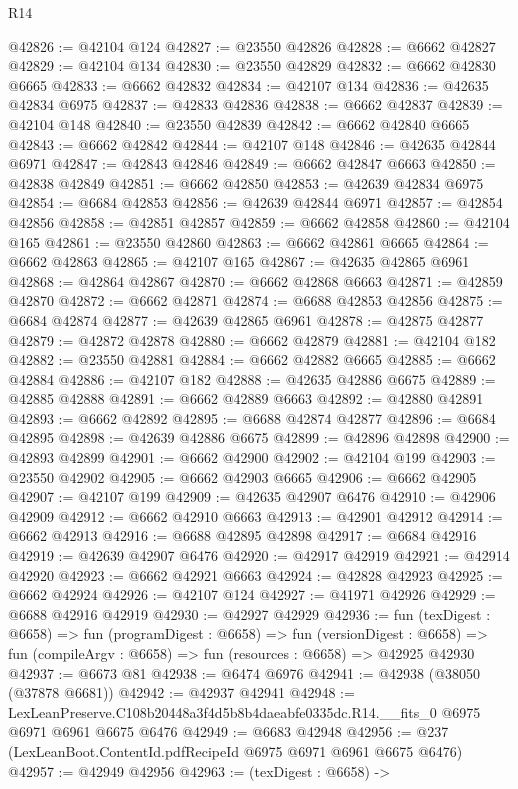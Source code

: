 \begin{lexlean}{R14}
\begin{coremodule}
@42826 := @42104 @124
@42827 := @23550 @42826
@42828 := @6662 @42827
@42829 := @42104 @134
@42830 := @23550 @42829
@42832 := @6662 @42830 @6665
@42833 := @6662 @42832
@42834 := @42107 @134
@42836 := @42635 @42834 @6975
@42837 := @42833 @42836
@42838 := @6662 @42837
@42839 := @42104 @148
@42840 := @23550 @42839
@42842 := @6662 @42840 @6665
@42843 := @6662 @42842
@42844 := @42107 @148
@42846 := @42635 @42844 @6971
@42847 := @42843 @42846
@42849 := @6662 @42847 @6663
@42850 := @42838 @42849
@42851 := @6662 @42850
@42853 := @42639 @42834 @6975
@42854 := @6684 @42853
@42856 := @42639 @42844 @6971
@42857 := @42854 @42856
@42858 := @42851 @42857
@42859 := @6662 @42858
@42860 := @42104 @165
@42861 := @23550 @42860
@42863 := @6662 @42861 @6665
@42864 := @6662 @42863
@42865 := @42107 @165
@42867 := @42635 @42865 @6961
@42868 := @42864 @42867
@42870 := @6662 @42868 @6663
@42871 := @42859 @42870
@42872 := @6662 @42871
@42874 := @6688 @42853 @42856
@42875 := @6684 @42874
@42877 := @42639 @42865 @6961
@42878 := @42875 @42877
@42879 := @42872 @42878
@42880 := @6662 @42879
@42881 := @42104 @182
@42882 := @23550 @42881
@42884 := @6662 @42882 @6665
@42885 := @6662 @42884
@42886 := @42107 @182
@42888 := @42635 @42886 @6675
@42889 := @42885 @42888
@42891 := @6662 @42889 @6663
@42892 := @42880 @42891
@42893 := @6662 @42892
@42895 := @6688 @42874 @42877
@42896 := @6684 @42895
@42898 := @42639 @42886 @6675
@42899 := @42896 @42898
@42900 := @42893 @42899
@42901 := @6662 @42900
@42902 := @42104 @199
@42903 := @23550 @42902
@42905 := @6662 @42903 @6665
@42906 := @6662 @42905
@42907 := @42107 @199
@42909 := @42635 @42907 @6476
@42910 := @42906 @42909
@42912 := @6662 @42910 @6663
@42913 := @42901 @42912
@42914 := @6662 @42913
@42916 := @6688 @42895 @42898
@42917 := @6684 @42916
@42919 := @42639 @42907 @6476
@42920 := @42917 @42919
@42921 := @42914 @42920
@42923 := @6662 @42921 @6663
@42924 := @42828 @42923
@42925 := @6662 @42924
@42926 := @42107 @124
@42927 := @41971 @42926
@42929 := @6688 @42916 @42919
@42930 := @42927 @42929
@42936 := fun (texDigest : @6658) =>
  fun (programDigest : @6658) =>
  fun (versionDigest : @6658) =>
  fun (compileArgv : @6658) => fun (resources : @6658) => @42925 @42930
@42937 := @6673 @81
@42938 := @6474 @6976
@42941 := @42938 (@38050 (@37878 @6681))
@42942 := @42937 @42941
@42948 := LexLeanPreserve.C108b20448a3f4d5b8b4daeabfe0335dc.R14.__fits_0
    @6975
    @6971
    @6961
    @6675
    @6476
@42949 := @6683 @42948
@42956 := @237 (LexLeanBoot.ContentId.pdfRecipeId @6975 @6971 @6961 @6675 @6476)
@42957 := @42949 @42956
@42963 := (texDigest : @6658) ->

\end{coremodule}
\end{lexlean}
